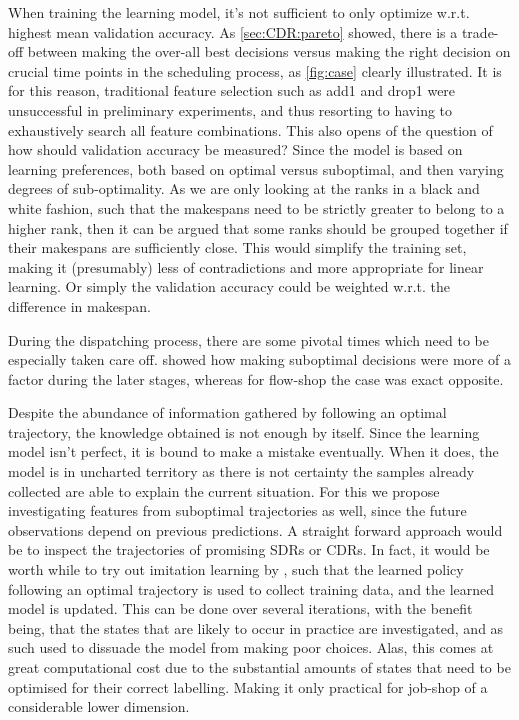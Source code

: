 \documentclass[smallextended]{svjour3}
\begin{document}
	When training the learning model, it's not sufficient to only optimize w.r.t. highest mean validation accuracy. As \cref{sec:CDR:pareto} showed, there is a trade-off between making the over-all best decisions versus making the right decision on crucial time points in the scheduling process, as \cref{fig:case} clearly illustrated. It is for this reason, traditional feature selection such as add1 and drop1 were unsuccessful in preliminary experiments, and thus resorting to having to exhaustively search all feature combinations.
	This also opens of the question of how should validation accuracy be measured? Since the model is based on learning preferences, both based on optimal versus suboptimal, and then varying degrees of sub-optimality. As we are only looking at the ranks in a black and white fashion, such that the makespans need to be strictly greater to belong to a higher rank, then it can be argued that some ranks should be grouped together if their makespans are sufficiently close. This would simplify the training set, making it (presumably) less of contradictions and more appropriate for linear learning. Or simply the validation accuracy could be weighted w.r.t. the  difference in makespan.
	
	During the dispatching process, there are some pivotal times which need to be especially taken care off.  showed how making suboptimal decisions were more of a factor during the later stages, whereas for flow-shop the case was exact opposite. 
	
	Despite the abundance of information gathered by following an optimal trajectory, the knowledge obtained is not enough by itself. Since the learning model isn't perfect, it is bound to make a mistake eventually. When it does, the model is in uncharted  territory as there is not certainty the samples already collected are able to explain the current situation. For this we propose investigating features from suboptimal trajectories as well, since the future observations depend on previous predictions. 
	 A straight forward approach would be to inspect the trajectories of promising SDRs or CDRs. 
	In fact, it would be worth while to try out imitation learning by \cite{RossB10,RossGB11}, such that the learned policy following an optimal trajectory is used to collect training data, and the learned model is updated. This can be done over several iterations, with the benefit being, that the states that are likely to occur in practice are investigated, and as such used to dissuade the model from making poor choices. Alas, this comes at great computational cost due to the substantial amounts of states that need to be optimised for their correct labelling. Making it only practical for job-shop of a considerable lower dimension. 
	
\end{document}
